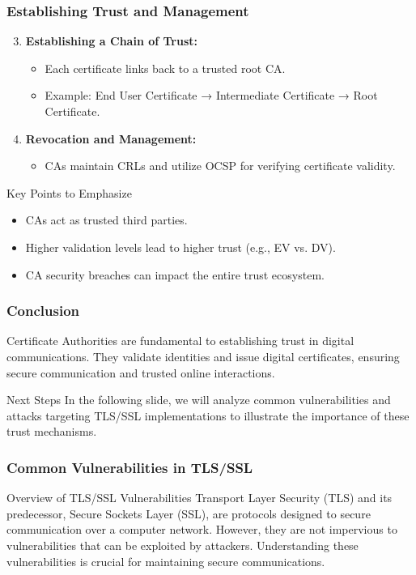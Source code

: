 \documentclass{beamer}
\begin{document}
\begin{frame}[fragile]
    \frametitle{Establishing Trust and Management}
    \begin{enumerate}
        \setcounter{enumi}{2} %
        \item \textbf{Establishing a Chain of Trust:}
            \begin{itemize}
                \item Each certificate links back to a trusted root CA.
                \item Example: End User Certificate → Intermediate Certificate → Root Certificate.
            \end{itemize}
        \item \textbf{Revocation and Management:}
            \begin{itemize}
                \item CAs maintain CRLs and utilize OCSP for verifying certificate validity.
            \end{itemize}
    \end{enumerate}
    \begin{block}{Key Points to Emphasize}
        \begin{itemize}
            \item CAs act as trusted third parties.
            \item Higher validation levels lead to higher trust (e.g., EV vs. DV).
            \item CA security breaches can impact the entire trust ecosystem.
        \end{itemize}
    \end{block}
\end{frame}

\begin{frame}[fragile]
    \frametitle{Conclusion}
    Certificate Authorities are fundamental to establishing trust in digital communications. They validate identities and issue digital certificates, ensuring secure communication and trusted online interactions.

    \begin{block}{Next Steps}
        In the following slide, we will analyze common vulnerabilities and attacks targeting TLS/SSL implementations to illustrate the importance of these trust mechanisms.
    \end{block}
\end{frame}

\begin{frame}[fragile]
    \frametitle{Common Vulnerabilities in TLS/SSL}
    \begin{block}{Overview of TLS/SSL Vulnerabilities}
        Transport Layer Security (TLS) and its predecessor, Secure Sockets Layer (SSL), are protocols designed to secure communication over a computer network. However, they are not impervious to vulnerabilities that can be exploited by attackers. Understanding these vulnerabilities is crucial for maintaining secure communications.
    \end{block}
\end{frame}
\end{document}
